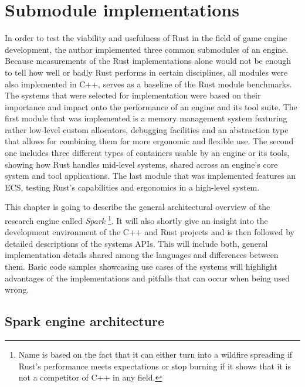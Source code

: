 \chapter{Submodule implementations}

In order to test the viability and usefulness of Rust in the field of game engine development, the author implemented three common submodules of an engine. Because measurements of the Rust implementations alone would not be enough to tell how well or badly Rust performs in certain disciplines, all modules were also implemented in C++, serves as a baseline of the Rust module benchmarks. The systems that were selected for implementation were based on their importance and impact onto the performance of an engine and its tool suite. The first module that was implemented is a memory management system featuring rather low-level custom allocators, debugging facilities and an abstraction type that allows for combining them for more ergonomic and flexible use. The second one includes three different types of containers usable by an engine or its tools, showing how Rust handles mid-level systems, shared across an engine's core system and tool applications. The last module that was implemented features an \ac{ECS}, testing Rust's capabilities and ergonomics in a high-level system. 

This chapter is going to describe the general architectural overview of the research engine called \textit{Spark} \footnote{Name is based on the fact that it can either turn into a wildfire spreading if Rust's performance meets expectations or stop burning if it shows that it is not a competitor of C++ in any field.}. It will also shortly give an insight into the development environment of the C++ and Rust projects and is then followed by detailed descriptions of the systems \acp{API}. This will include both, general implementation details shared among the languages and differences between them. Basic code samples showcasing use cases of the systems will highlight advantages of the implementations and pitfalls that can occur when being used wrong.

\section{Spark engine architecture}

